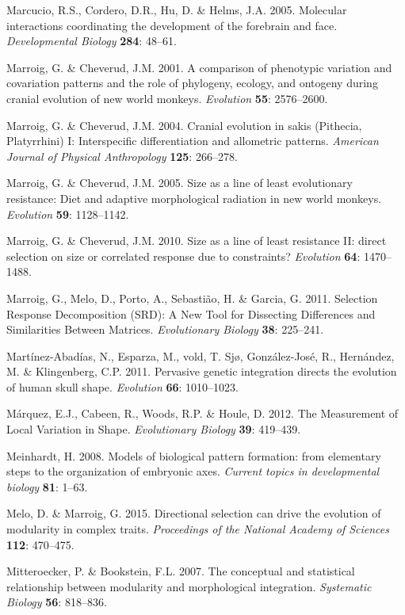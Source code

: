 \documentclass[11pt,twoside]{report}
\begin{document}
Marcucio, R.S., Cordero, D.R., Hu, D. \& Helms, J.A. 2005. Molecular
interactions coordinating the development of the forebrain and face.
\emph{Developmental Biology} \textbf{284}: 48--61.

Marroig, G. \& Cheverud, J.M. 2001. A comparison of phenotypic variation
and covariation patterns and the role of phylogeny, ecology, and
ontogeny during cranial evolution of new world monkeys. \emph{Evolution}
\textbf{55}: 2576--2600.

Marroig, G. \& Cheverud, J.M. 2004. Cranial evolution in sakis
(Pithecia, Platyrrhini) I: Interspecific differentiation and allometric
patterns. \emph{American Journal of Physical Anthropology} \textbf{125}:
266--278.

Marroig, G. \& Cheverud, J.M. 2005. Size as a line of least evolutionary
resistance: Diet and adaptive morphological radiation in new world
monkeys. \emph{Evolution} \textbf{59}: 1128--1142.

Marroig, G. \& Cheverud, J.M. 2010. Size as a line of least resistance
II: direct selection on size or correlated response due to constraints?
\emph{Evolution} \textbf{64}: 1470--1488.

Marroig, G., Melo, D., Porto, A., Sebastião, H. \& Garcia, G. 2011.
Selection Response Decomposition (SRD): A New Tool for Dissecting
Differences and Similarities Between Matrices. \emph{Evolutionary
Biology} \textbf{38}: 225--241.

Martínez-Abadías, N., Esparza, M., vold, T. Sjø, González-José, R.,
Hernández, M. \& Klingenberg, C.P. 2011. Pervasive genetic integration
directs the evolution of human skull shape. \emph{Evolution}
\textbf{66}: 1010--1023.

Márquez, E.J., Cabeen, R., Woods, R.P. \& Houle, D. 2012. The
Measurement of Local Variation in Shape. \emph{Evolutionary Biology}
\textbf{39}: 419--439.

Meinhardt, H. 2008. Models of biological pattern formation: from
elementary steps to the organization of embryonic axes. \emph{Current
topics in developmental biology} \textbf{81}: 1--63.

Melo, D. \& Marroig, G. 2015. Directional selection can drive the
evolution of modularity in complex traits. \emph{Proceedings of the
National Academy of Sciences} \textbf{112}: 470--475.

Mitteroecker, P. \& Bookstein, F.L. 2007. The conceptual and statistical
relationship between modularity and morphological integration.
\emph{Systematic Biology} \textbf{56}: 818--836.
\end{document}
